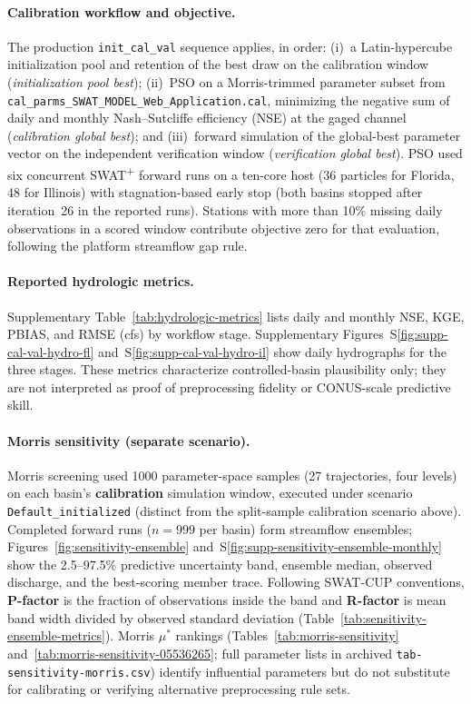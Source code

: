 \paragraph{Calibration workflow and objective.}
The production \texttt{init\_cal\_val} sequence applies, in order: (i)~a Latin-hypercube initialization pool and retention of the best draw on the calibration window (\emph{initialization pool best}); (ii)~PSO on a Morris-trimmed parameter subset from \texttt{cal\_parms\_SWAT\_MODEL\_Web\_Application.cal}, minimizing the negative sum of daily and monthly Nash--Sutcliffe efficiency (NSE) at the gaged channel (\emph{calibration global best}); and (iii)~forward simulation of the global-best parameter vector on the independent verification window (\emph{verification global best}).
PSO used six concurrent SWAT\textsuperscript{+} forward runs on a ten-core host (36 particles for Florida, 48 for Illinois) with stagnation-based early stop (both basins stopped after iteration~26 in the reported runs).
Stations with more than 10\% missing daily observations in a scored window contribute objective zero for that evaluation, following the platform streamflow gap rule.

\paragraph{Reported hydrologic metrics.}
Supplementary Table~\ref{tab:hydrologic-metrics} lists daily and monthly NSE, KGE, PBIAS, and RMSE (cfs) by workflow stage.
Supplementary Figures~S\ref{fig:supp-cal-val-hydro-fl} and~S\ref{fig:supp-cal-val-hydro-il} show daily hydrographs for the three stages.
These metrics characterize controlled-basin plausibility only; they are not interpreted as proof of preprocessing fidelity or CONUS-scale predictive skill.

\paragraph{Morris sensitivity (separate scenario).}
Morris screening used 1000 parameter-space samples (27 trajectories, four levels) on each basin's \textbf{calibration} simulation window, executed under scenario \texttt{Default\_initialized} (distinct from the split-sample calibration scenario above).
Completed forward runs ($n=999$ per basin) form streamflow ensembles; Figures~\ref{fig:sensitivity-ensemble} and~S\ref{fig:supp-sensitivity-ensemble-monthly} show the 2.5--97.5\% predictive uncertainty band, ensemble median, observed discharge, and the best-scoring member trace.
Following SWAT-CUP conventions, \textbf{P-factor} is the fraction of observations inside the band and \textbf{R-factor} is mean band width divided by observed standard deviation (Table~\ref{tab:sensitivity-ensemble-metrics}).
Morris $\mu^*$ rankings (Tables~\ref{tab:morris-sensitivity} and~\ref{tab:morris-sensitivity-05536265}; full parameter lists in archived \texttt{tab-sensitivity-morris.csv}) identify influential parameters but do not substitute for calibrating or verifying alternative preprocessing rule sets.
